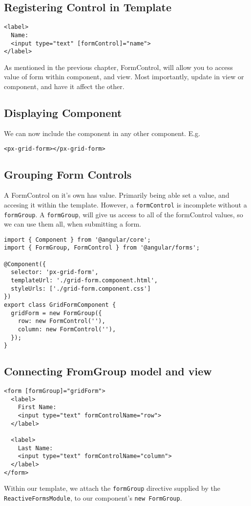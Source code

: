\subsection{Registering Control in Template}
\begin{lstlisting}
<label>
  Name:
  <input type="text" [formControl]="name">
</label>
\end{lstlisting}

As mentioned in the previous chapter, FormControl, will allow you to access 
value of form within component, and view. Most importantly, update in view 
or component, and have it affect the other. 

\subsection{ Displaying Component }
We can now include the component in any other component. E.g. 
\begin{lstlisting}[caption=app.component.html]
<px-grid-form></px-grid-form>  
\end{lstlisting}

\subsection{ Grouping Form Controls }
A FormControl on it's own has value. Primarily being able set a value, and
accesing it within the template. However, a \lstinline{formControl} is 
incomplete without a \lstinline{formGroup}. A \lstinline{formGroup}, will give us 
access to all of the formControl values, so we can use them all, when 
submitting a form. 

\begin{lstlisting}
import { Component } from '@angular/core';
import { FormGroup, FormControl } from '@angular/forms';
 
@Component({
  selector: 'px-grid-form',
  templateUrl: './grid-form.component.html',
  styleUrls: ['./grid-form.component.css']
})
export class GridFormComponent {
  gridForm = new FormGroup({
    row: new FormControl(''),
    column: new FormControl(''),
  });
}
\end{lstlisting}

\subsection{ Connecting FromGroup model and view }
\begin{lstlisting}
<form [formGroup]="gridForm">
  <label>
    First Name:
    <input type="text" formControlName="row">
  </label>

  <label>
    Last Name:
    <input type="text" formControlName="column">
  </label>
</form>
\end{lstlisting}
Within our template, we attach the \lstinline{formGroup} directive supplied by
the \lstinline{ReactiveFormsModule}, to our component's \lstinline{new FormGroup}.

